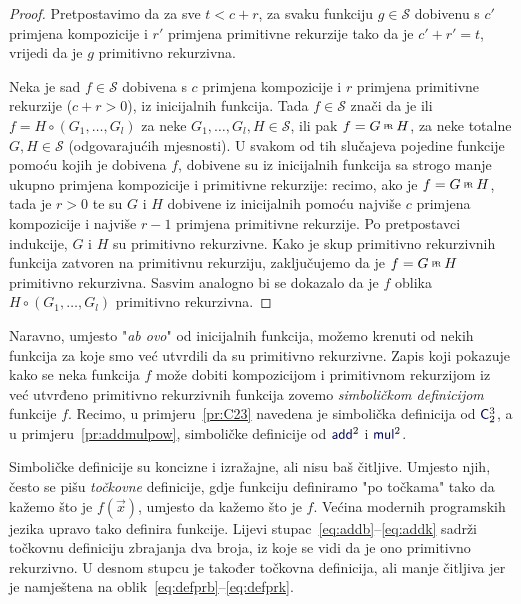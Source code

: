 \begin{proof}
Pretpostavimo da za sve $t<c+r$, za svaku funkciju $g\in\mathcal S$ dobivenu s $c'$ primjena kompozicije i $r'$ primjena primitivne rekurzije tako da je $c'+r'=t$, vrijedi da je $g$ primitivno rekurzivna.

    Neka je sad $f\in\mathcal S$ dobivena s $c$ primjena kompozicije i $r$ primjena primitivne rekurzije ($c+r>0$), iz inicijalnih funkcija. Tada $f\in\mathcal S$ znači da je ili $f=H\circ(G_1,\dotsc,G_l)$ za neke $G_1,\dotsc,G_l,H\in\mathcal S$, ili pak $f=G\pr H$, za neke totalne $G,H\in\mathcal S$ (odgovarajućih mjesnosti). U svakom od tih slučajeva pojedine funkcije pomoću kojih je dobivena $f$, dobivene su iz inicijalnih funkcija sa strogo manje ukupno primjena kompozicije i primitivne rekurzije: recimo, ako je $f=G\pr H$, tada je $r>0$ te su $G$ i $H$ dobivene iz inicijalnih pomoću najviše $c$ primjena kompozicije i najviše $r-1$ primjena primitivne rekurzije. Po pretpostavci indukcije, $G$ i $H$ su primitivno rekurzivne. Kako je skup primitivno rekurzivnih funkcija zatvoren na primitivnu rekurziju, zaključujemo da je $f=G\pr H$ primitivno rekurzivna. Sasvim analogno bi se dokazalo da je $f$ oblika $H\circ(G_1,\dotsc,G_l)$ primitivno rekurzivna.
\end{proof}

\begin{napomena}[{name=[ulančavanje simboličkih definicija]}]\label{nap:symbdef}
Naravno, umjesto "\emph{ab ovo}" od inicijalnih funkcija, možemo krenuti od nekih funkcija za koje smo već utvrdili da su primitivno rekurzivne. Zapis koji pokazuje kako se neka funkcija $f$ može dobiti kompozicijom i primitivnom rekurzijom iz već utvrđeno primitivno rekurzivnih funkcija zovemo \emph{simboličkom definicijom} funkcije $f$. Recimo, u primjeru~\ref{pr:C23} navedena je simbolička definicija od $\f C_2^3$, a u primjeru~\ref{pr:addmulpow}, simboličke definicije od $\f{add}^2$ i $\f{mul}^2$.
\end{napomena}

Simboličke definicije su koncizne i izražajne, ali nisu baš čitljive. Umjesto njih, često se pišu \emph{točkovne} definicije, gdje funkciju definiramo "po točkama" tako da kažemo što je $f(\vec x)$, umjesto da kažemo što je $f$. Većina modernih programskih jezika upravo tako definira funkcije. Lijevi stupac~\eqref{eq:addb}--\eqref{eq:addk} sadrži točkovnu definiciju zbrajanja dva broja, iz koje se vidi da je ono primitivno rekurzivno. U desnom stupcu je također točkovna definicija, ali manje čitljiva jer je namještena na oblik~\eqref{eq:defprb}--\eqref{eq:defprk}.

